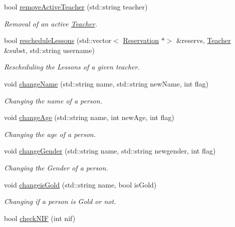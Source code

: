 \begin{DoxyCompactItemize}
bool \mbox{\hyperlink{class_company_ad35562fb6b18125ab7fe30cb79639cf7}{remove\+Active\+Teacher}} (std\+::string teacher)
\begin{DoxyCompactList}\small\item\em Removal of an active \mbox{\hyperlink{class_teacher}{Teacher}}. \end{DoxyCompactList}\item 
bool \mbox{\hyperlink{class_company_ae858645003e1a2cd2e38f6db4feda488}{reschedule\+Lessons}} (std\+::vector$<$ \mbox{\hyperlink{class_reservation}{Reservation}} $\ast$$>$ \&reservs, \mbox{\hyperlink{class_teacher}{Teacher}} \&subst, std\+::string username)
\begin{DoxyCompactList}\small\item\em Rescheduling the Lessons of a given teacher. \end{DoxyCompactList}\item 
void \mbox{\hyperlink{class_company_a51a026758b4b56b4a2e0fa937125480d}{change\+Name}} (std\+::string name, std\+::string new\+Name, int flag)
\begin{DoxyCompactList}\small\item\em Changing the name of a person. \end{DoxyCompactList}\item 
void \mbox{\hyperlink{class_company_ab06a4393f8658aecd365c9425ce85cc3}{change\+Age}} (std\+::string name, int new\+Age, int flag)
\begin{DoxyCompactList}\small\item\em Changing the age of a person. \end{DoxyCompactList}\item 
void \mbox{\hyperlink{class_company_acded77254726ba932810fa4b67136d2e}{change\+Gender}} (std\+::string name, std\+::string newgender, int flag)
\begin{DoxyCompactList}\small\item\em Changing the Gender of a person. \end{DoxyCompactList}\item 
void \mbox{\hyperlink{class_company_ab33cbb2392281b852f32ef6869309d68}{changeis\+Gold}} (std\+::string name, bool is\+Gold)
\begin{DoxyCompactList}\small\item\em Changing if a person is Gold or not. \end{DoxyCompactList}\item 
bool \mbox{\hyperlink{class_company_a53a891acc19de4d24a82fd9f108cfe68}{check\+N\+IF}} (int nif)
$$
\end{DoxyCompactItemize}
